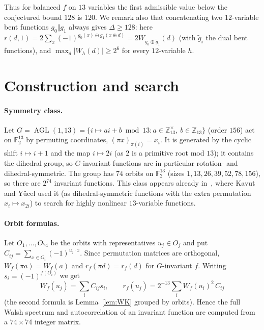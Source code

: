 \documentclass[11pt]{article}
\numberwithin{equation}{section}
\theoremstyle{definition}
\theoremstyle{remark}
\newcommand{\F}{\mathbb F}
\newcommand{\Z}{\mathbb Z}
\DeclareMathOperator{\AGL}{AGL}
\begin{document}
Thus for balanced $f$ on $13$ variables the first admissible value below the conjectured bound $128$ is
$120$. We remark also that concatenating two $12$-variable bent functions $g_0\Vert g_1$ always gives
$\Delta\ge128$: here $r(d,1)=2\sum_x(-1)^{g_0(x)\oplus g_1(x\oplus d)}=2W_{\tilde g_0\oplus\tilde g_1}(d)$
(with $\tilde g_i$ the dual bent functions), and $\max_d|W_h(d)|\ge 2^6$ for every $12$-variable $h$.

\section{Construction and search}\label{sec:search}

\paragraph{Symmetry class.} Let $G=\AGL(1,13)=\{i\mapsto ai+b \bmod 13: a\in\Z_{13}^\times,\ b\in\Z_{13}\}$
(order $156$) act on $\F_2^{13}$ by permuting coordinates, $(\pi x)_{\pi(i)}=x_i$. It is generated by the
cyclic shift $i\mapsto i+1$ and the map $i\mapsto 2i$ (as $2$ is a primitive root mod $13$); it contains the
dihedral group, so $G$-invariant functions are in particular rotation- and dihedral-symmetric. The group
has $74$ orbits on $\F_2^{13}$ (sizes $1,13,26,39,52,78,156$), so there are $2^{74}$ invariant functions.
This class appears already in~\cite{KY10}, where Kavut and Y\"ucel used it (as dihedral-symmetric
functions with the extra permutation $x_i\mapsto x_{2i}$) to search for highly nonlinear $13$-variable
functions.

\paragraph{Orbit formulas.} Let $O_1,\dots,O_{74}$ be the orbits with representatives $u_j\in O_j$ and put
$C_{ij}=\sum_{x\in O_i}(-1)^{u_j\cdot x}$. Since permutation matrices are orthogonal,
$W_f(\pi a)=W_f(a)$ and $r_f(\pi d)=r_f(d)$ for $G$-invariant $f$. Writing $s_i=(-1)^{f(O_i)}$ we get
\[
W_f(u_j)=\sum_i C_{ij}s_i,\qquad r_f(u_j)=2^{-13}\sum_i W_f(u_i)^2\,C_{ij}
\]
(the second formula is Lemma~\ref{lem:WK} grouped by orbits). Hence the full Walsh spectrum and autocorrelation
of an invariant function are computed from a $74\times 74$ integer matrix.
\end{document}
